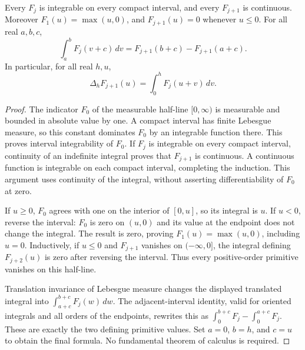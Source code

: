 \begin{lemma}
\label{kernel:primitive-integral}
\leanok
Every $F_j$ is integrable on every compact interval, and every $F_{j+1}$
is continuous.  Moreover $F_1(u)=\max(u,0)$, and
$F_{j+1}(u)=0$ whenever $u\leq0$.
For all real $a,b,c$,
\[
 \int_a^bF_j(v+c)\,dv
 =F_{j+1}(b+c)-F_{j+1}(a+c).
\]
In particular, for all real $h,u$,
\[
 \Delta_hF_{j+1}(u)=\int_0^hF_j(u+v)\,dv.
\]
\end{lemma}
\begin{proof}
The indicator $F_0$ of the measurable half-line $[0,\infty)$ is
measurable and bounded in absolute value by one.  A compact interval
has finite Lebesgue measure, so this constant dominates $F_0$ by an
integrable function there.  This proves interval integrability of $F_0$.
If $F_j$ is integrable on every compact interval, continuity of an
indefinite integral proves that $F_{j+1}$ is continuous.  A continuous
function is integrable on each compact interval, completing the induction.
This argument uses continuity of the integral, without asserting
differentiability of $F_0$ at zero.

If $u\geq0$, $F_0$ agrees with one on the interior of $[0,u]$, so its
integral is $u$.  If $u<0$, reverse the interval: $F_0$ is zero on
$(u,0)$ and its value at the endpoint does not change the integral.
The result is zero, proving $F_1(u)=\max(u,0)$, including $u=0$.
Inductively, if $u\leq0$ and $F_{j+1}$ vanishes on $(-\infty,0]$,
the integral defining $F_{j+2}(u)$ is zero after reversing the interval.
Thus every positive-order primitive vanishes on this half-line.

Translation invariance of Lebesgue measure changes the displayed
translated integral into $\int_{a+c}^{b+c}F_j(w)\,dw$.
The adjacent-interval identity, valid for oriented integrals and all
orders of the endpoints, rewrites this as
$\int_0^{b+c}F_j-\int_0^{a+c}F_j$.
These are exactly the two defining primitive values.
Set $a=0$, $b=h$, and $c=u$ to obtain the final formula.
No fundamental theorem of calculus is required.
\end{proof}

